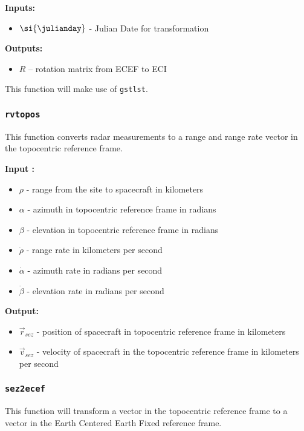 \documentclass[11pt, reqno]{article}    %
\begin{document}
\noindent \textbf{Inputs: }
\begin{itemize}
    \item \( \si{\julianday} \) - Julian Date for transformation
\end{itemize}

\noindent \textbf{Outputs: }
\begin{itemize}
    \item \( R \) -- rotation matrix from ECEF to ECI
\end{itemize}

This function will make use of \texttt{gstlst}.

\subsubsection*{\texttt{rvtopos}}
This function converts radar measurements to a range and range rate vector in the topocentric reference frame.

\noindent \textbf{Input : }
\begin{itemize}
    \item \( \rho \) - range from the site to spacecraft in kilometers
    \item \( \alpha \) - azimuth in topocentric reference frame in radians
    \item \( \beta \) - elevation in topocentric reference frame in radians 
    \item \( \dot{\rho} \) - range rate in kilometers per second
    \item \( \dot{\alpha} \) - azimuth rate in radians per second
    \item \( \dot{\beta} \) - elevation rate in radians per second
\end{itemize}

\noindent \textbf{Output: }

\begin{itemize}
    \item \( \vec r_{sez} \) - position of spacecraft in topocentric reference frame in kilometers
    \item \( \vec v_{sez} \) - velocity of spacecraft in the topocentric reference frame in kilometers per second
\end{itemize}

\subsubsection*{\texttt{sez2ecef}}
This function will transform a vector in the topocentric reference frame to a vector in the Earth Centered Earth Fixed reference frame.
\end{document}
